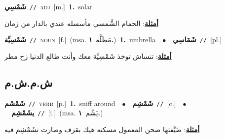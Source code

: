 \documentclass[10pt,a4paper,twoside]{article} %
\begin{document}
\begin{multicols}{2}
{\setlength\topsep{0pt}\textbf{\foreignlanguage{arabic}{شَمْسِي}}\ {\color{gray}\texttt{//}\color{black}}\ \textsc{adj}\ [m.]\ \textbf{1.}~solar\  \begin{flushright}\color{gray}\foreignlanguage{arabic}{\textbf{\underline{\foreignlanguage{arabic}{أمثلة}}}: الحمام الشَّمسي مأسسله عندي بالدار من زمان}\end{flushright}\color{black}} \vspace{2mm}

{\setlength\topsep{0pt}\textbf{\foreignlanguage{arabic}{شَمْسِيِّة}}\ {\color{gray}\texttt{//}\color{black}}\ \textsc{noun}\ [f.]\ \color{gray}(msa. \foreignlanguage{arabic}{مَظَلَّة}~\foreignlanguage{arabic}{\textbf{١.}})\color{black}\ \textbf{1.}~umbrella\ \ $\bullet$\ \ \setlength\topsep{0pt}\textbf{\foreignlanguage{arabic}{شَمَاسِي}}\ {\color{gray}\texttt{//}\color{black}}\ [pl.]\  \begin{flushright}\color{gray}\foreignlanguage{arabic}{\textbf{\underline{\foreignlanguage{arabic}{أمثلة}}}: تنساش توخذ شَمْسِيِّة معك وأنت طالع الدنيا زخ مطر}\end{flushright}\color{black}} \vspace{2mm}

\vspace{-3mm}
\subsection*{\color{blue}\foreignlanguage{arabic}{ش.م.ش.م}\color{blue}{}} 

{\setlength\topsep{0pt}\textbf{\foreignlanguage{arabic}{شَمْشَم}}\ {\color{gray}\texttt{//}\color{black}}\ \textsc{verb}\ [p.]\ \textbf{1.}~sniff around\ \ $\bullet$\ \ \setlength\topsep{0pt}\textbf{\foreignlanguage{arabic}{شَمْشِم}}\ {\color{gray}\texttt{//}\color{black}}\ [c.]\ \ $\bullet$\ \ \setlength\topsep{0pt}\textbf{\foreignlanguage{arabic}{يشَمْشِم}}\ {\color{gray}\texttt{//}\color{black}}\ [i.]\ \color{gray}(msa. \foreignlanguage{arabic}{يَشُم}~\foreignlanguage{arabic}{\textbf{١.}})\color{black}\  \begin{flushright}\color{gray}\foreignlanguage{arabic}{\textbf{\underline{\foreignlanguage{arabic}{أمثلة}}}: ضَيَّفتها صحن المعمول مسكته هيك بقرف وصارت تشَمْشِم فيه}\end{flushright}\color{black}} \vspace{2mm}


\end{multicols}
\end{document}
